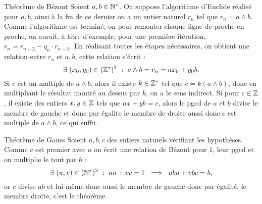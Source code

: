 \documentclass{article}
\date{4 Février 2024}
\begin{document}
\maketitle

\begin{question_kholle}
	[Soient $a,b\in \N ^*$ et $c\in \Z$. Il existe des entiers $x,y\in \Z$ tels que $ax + yb = c$ si et seulement si $c$ est multiple du pgcd de $a$ et $b$.]
	{Théorème de Bézout}
	Soient $a,b\in \N^*$. On suppose l'algorithme d'Euclide réalisé pour $a,b$, ainsi à la fin de ce dernier on a un entier naturel $r_n$ tel que $r_n = a\wedge b$. Comme l'algorithme est terminé, on peut remonter chaque ligne de proche en proche, on aurait, à titre d'exemple, pour une première itération, $r_n =r_{n-2} - q_{n} \cdot r_{n-1}$. En réalisant toutes les étapes nécessaires, on obtient une relation entre $r_n$ et $a,b$, cette relation s'écrit : $$\exists \ (x_0, y_0)\in (\mathbb Z ^*)^2 \ : \ a\wedge b = r_n = ax_0 + y_0b.$$
	Si $c$ est un multiple de $a\wedge b $, alors il existe $k\in \mathbb Z^*$ tel que $c = k(a\wedge b)$, donc en multipliant le résultat montré au dessus par $k$, on a le sens indirect. Si pour $c\in \Z$, il existe des entiers $x,y\in \Z$ tels que $ax + yb = c$, alors le pgcd de $a$ et $b$ divise le membre de gauche et donc par égalite le membre de droite aussi donc $c$ est multiple de $a\wedge b$, ce qui suffit.
\end{question_kholle}

\begin{question_kholle}
	{Théorème de Gauss}
	Soient $a,b,c$ des entiers naturels vérifiant les hypothèses. \\
	Comme $c$ est premier avec $a$ on écrit une relation de Bézout pour $1$, leur pgcd et on multiplie le tout par $b$ :
	$$\exists \ (u,v) \in (\mathbb N ^*)^2 \ : \ au + vc = 1 \ \implies \ abu + vbc = b, $$
	or $c$ divise $ab$ et lui-même donc aussi le membre de gauche donc par égalité, le membre droite, c'est le théorème.
\end{question_kholle}
\end{document}

